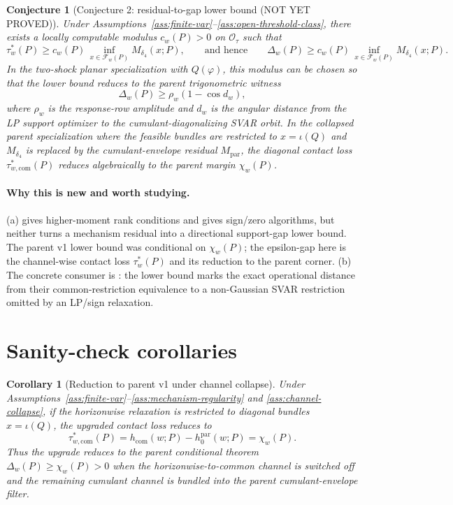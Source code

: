 \documentclass[11pt]{article}
\theoremstyle{definition}
\theoremstyle{plain}
\newtheorem{conjecture}{Conjecture}
\newtheorem{corollary}{Corollary}
\theoremstyle{remark}
\begin{document}
\begin{conjecture}[Conjecture 2: residual-to-gap lower bound (NOT YET PROVED)]\label{conj:threshold-lower-bound}
Under Assumptions~\ref{ass:finite-var}--\ref{ass:open-threshold-class}, there exists a locally computable modulus \(c_w(P)>0\) on \(\mathcal O_\tau\) such that
\[
\tau_w^*(P)\ge c_w(P)\,
\inf_{x\in\mathcal F_w(P)}M_{\delta_4}(x;P),
\qquad\text{and hence}\qquad
\Delta_w(P)\ge c_w(P)\,
\inf_{x\in\mathcal F_w(P)}M_{\delta_4}(x;P).
\]
In the two-shock planar specialization with \(Q(\varphi)\), this modulus can be chosen so that the lower bound reduces to the parent trigonometric witness
\[
\Delta_w(P)\ge \rho_w(1-\cos d_w),
\]
where \(\rho_w\) is the response-row amplitude and \(d_w\) is the angular distance from the LP support optimizer to the cumulant-diagonalizing SVAR orbit.  In the collapsed parent specialization where the feasible bundles are restricted to \(x=\iota(Q)\) and \(M_{\delta_4}\) is replaced by the cumulant-envelope residual \(M_{\mathrm{par}}\), the diagonal contact loss \(\tau_{w,\mathrm{com}}^*(P)\) reduces algebraically to the parent margin \(\chi_w(P)\).
\end{conjecture}
\paragraph{Why this is new and worth studying.}
(a) \citet[pp.~27--46]{Guay2021} gives higher-moment rank conditions and \citet[Section~4 and Algorithm~4.1]{Read2022} gives sign/zero algorithms, but neither turns a mechanism residual into a directional support-gap lower bound.  The parent v1 lower bound was conditional on \(\chi_w(P)\); the epsilon-gap here is the channel-wise contact loss \(\tau_w^*(P)\) and its reduction to the parent corner.  (b) The concrete consumer is \citet[abstract and pp.~955--980]{PlagborgMollerWolf2021}: the lower bound marks the exact operational distance from their common-restriction equivalence to a non-Gaussian SVAR restriction omitted by an LP/sign relaxation.

\section{Sanity-check corollaries}
\begin{corollary}[Reduction to parent v1 under channel collapse]\label{cor:parent-collapse}
Under Assumptions~\ref{ass:finite-var}--\ref{ass:mechanism-regularity} and \ref{ass:channel-collapse}, if the horizonwise relaxation is restricted to diagonal bundles \(x=\iota(Q)\), the upgraded contact loss reduces to
\[
\tau_{w,\mathrm{com}}^*(P)=h_{\mathrm{com}}(w;P)-h^{\mathrm{par}}_0(w;P)=\chi_w(P).
\]
Thus the upgrade reduces to the parent conditional theorem \(\Delta_w(P)\ge\chi_w(P)>0\) when the horizonwise-to-common channel is switched off and the remaining cumulant channel is bundled into the parent cumulant-envelope filter.
\end{corollary}
\end{document}
